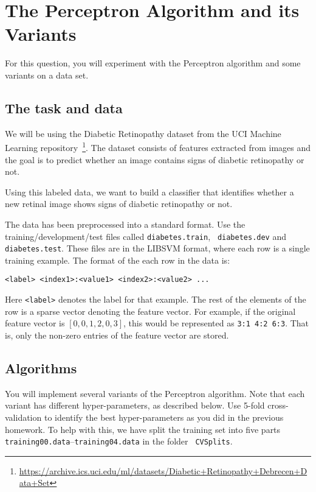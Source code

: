 \section{The Perceptron Algorithm and its Variants}\label{sec:q4}

For this question, you will experiment with the Perceptron algorithm
and some variants on a data set.

\subsection{The task and data}

We will be using the Diabetic Retinopathy dataset from the UCI
Machine Learning
repository~\footnote{\url{https://archive.ics.uci.edu/ml/datasets/Diabetic+Retinopathy+Debrecen+Data+Set}}. The
dataset consists of features extracted from images and the goal is
to predict whether an image contains signs of diabetic retinopathy
or not.

Using this labeled data, we want to build a classifier that
identifies whether a new retinal image shows signs of diabetic
retinopathy or not.

The data has been preprocessed into a standard format.  Use the
training/development/test files called {\tt diabetes.train}, {\tt
  diabetes.dev} and {\tt diabetes.test}.  These files are in the
LIBSVM format, where each row is a single training example. The
format of the each row in the data is:

\begin{center} 
  {\tt <label> <index1>:<value1> <index2>:<value2> ...}
\end{center}

Here {\tt <label>} denotes the label for that example.  The rest of
the elements of the row is a sparse vector denoting the feature
vector.  For example, if the original feature vector is
$[0, 0, 1, 2, 0, 3]$, this would be represented as {\tt 3:1 4:2 6:3}.
That is, only the non-zero entries of the feature vector are stored.

\subsection{Algorithms}

You will implement several variants of the Perceptron algorithm. Note
that each variant has different hyper-parameters, as described
below. Use 5-fold cross-validation to identify the best
hyper-parameters as you did in the previous homework. To help with
this, we have split the training set into five parts {\tt
  training00.data}--{\tt training04.data} in the folder {\tt
  CVSplits}.

